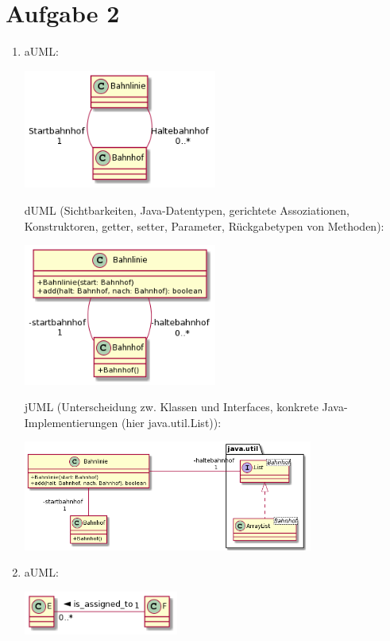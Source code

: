\documentclass{article}
\begin{document}
	\section*{Aufgabe 2}
	\begin{enumerate}[label=(\alph*)]
		\item aUML:
		\begin{center}
			\includegraphics[width=0.5\textwidth]{./Aufgabe13_2a1}
		\end{center}
		dUML (Sichtbarkeiten, Java-Datentypen, gerichtete Assoziationen, Konstruktoren, getter, setter, Parameter, Rückgabetypen von Methoden):
		\begin{center}
			\includegraphics[width=0.5\textwidth]{./Aufgabe13_2a2}
		\end{center}
		jUML (Unterscheidung zw. Klassen und Interfaces, konkrete Java-Implementierungen (hier java.util.List)):
		\begin{center}
			\includegraphics[width=0.75\textwidth]{./Aufgabe13_2a3}
		\end{center}
		\item aUML:
		\begin{center}
			\includegraphics[width=0.4\textwidth]{./Aufgabe13_2b1}

\end{center}
\end{enumerate}
\end{document}
